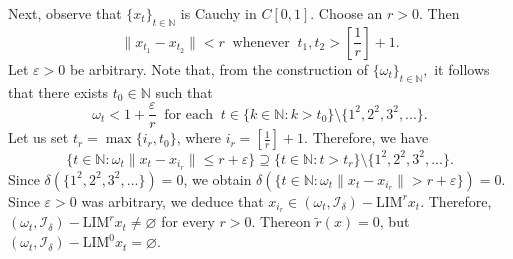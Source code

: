 \documentclass[reqno]{amsart}
\begin{document}
{\begin{example}
	
	Next, observe that  $\{x_t\}_{t\in\mathbb{N}}$ is Cauchy in $C[0,1]$. Choose an $r>0$. Then
	\begin{equation*}\|x_{t_1}-x_{t_2}\|<r~\mbox{ whenever }~t_1,t_2>\left[\frac{1}{r}\right]+1.
	\end{equation*}
	Let $\varepsilon>0$ be arbitrary. Note that, from the construction of $\{\omega_t\}_{t\in\mathbb{N}},$ it follows that there exists  $t_0\in\mathbb{N}$ such that
	$$\omega_t<1+\frac{\varepsilon}{r} ~\mbox{ for each }~t\in\{k\in\mathbb{N}:k>t_0\} \setminus\{1^2,2^2,3^2,...\}.$$
	Let us set $t_r=\max\{i_r,t_0\}$, where $i_r=\left[\frac{1}{r}\right]+1$. Therefore, we have
	\begin{equation*}
		\{t\in\mathbb{N}:\omega_t\|x_t-x_{i_r}\|\leq r+\varepsilon\}\supseteq \{t\in\mathbb{N}:t> t_r\}\setminus \{1^2,2^2,3^2,...\}.
	\end{equation*}
	Since $\delta(\{1^2,2^2,3^2,...\})=0$, we obtain $\delta(\{t\in\mathbb{N}:\omega_t\|x_t-x_{i_r}\|>r+\varepsilon\})=0$. Since $\varepsilon>0$ was arbitrary, we deduce that
	$x_{i_r}\in (\omega_t,\mathcal{I}_{\delta})-\text{LIM}^{r} x_t$. Therefore, 
	$(\omega_t,\mathcal{I}_{\delta})-\text{LIM}^{r}x_t\neq\varnothing$ for every  $r>0$. Thereon $\tilde{r}(x)=0$, but 
	$(\omega_t,\mathcal{I}_{\delta})-\text{LIM}^{0} x_t=\varnothing.$	
\end{example}






}
\end{document}
